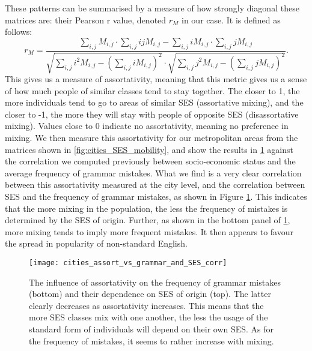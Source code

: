 \documentclass[../thesis.tex]{subfiles}
\begin{document}
These patterns can be summarised by a measure of how strongly diagonal these matrices
are: their Pearson r value, denoted $r_M$ in our case. It is defined as follows:
\begin{equation}
  r_M = \frac{
      \sum_{i, j} M_{i, j} \cdot \sum_{i, j} i j M_{i, j}
      - \sum_{i, j} i M_{i, j} \cdot \sum_{i, j} j M_{i, j}
    }{
      \sqrt{\sum_{i, j} i^2 M_{i, j} - \left( \sum_{i, j} i M_{i, j} \right)^2}
      \cdot \sqrt{\sum_{i, j} j^2 M_{i, j} - \left( \sum_{i, j} j M_{i, j} \right)^2}
    }.
\end{equation}
This gives us a measure of assortativity, meaning that this metric gives us a sense of
how much people of similar classes tend to stay together. The closer to 1, the more
individuals tend to go to areas of similar \ac{SES} (assortative mixing), and the closer
to -1, the more they will stay with people of opposite \ac{SES} (disassortative mixing).
Values close to 0 indicate no assortativity, meaning no preference in mixing. We then
measure this assortativity for our metropolitan areas from the matrices shown in
\cref{fig:cities_SES_mobility}, and show the results in
\cref{fig:cities_assort_vs_grammar_and_SES_corr} against the correlation we computed
previously between socio-economic status and the average frequency of grammar mistakes.
What we find is a very clear correlation between this assortativity measured at the city
level, and the correlation between \ac{SES} and the frequency of grammar mistakes, as
shown in Figure \cref{fig:cities_assort_vs_grammar_and_SES_corr}. This indicates that
the more mixing in the population, the less the frequency of mistakes is determined by
the \ac{SES} of origin. Further, as shown in the bottom panel of
\cref{fig:cities_assort_vs_grammar_and_SES_corr}, more mixing tends to imply more
frequent mistakes. It then appears to favour the spread in popularity of non-standard
English.
\begin{figure}
\centering
  \texttt{[image: cities\_assort\_vs\_grammar\_and\_SES\_corr]}
  \caption{The influence of assortativity on the frequency of grammar mistakes (bottom)
  and their dependence on \ac{SES} of origin (top). The latter clearly decreases as
  assortativity increases. This means that the more \ac{SES} classes mix with one
  another, the less the usage of the standard form of individuals will depend on their
  own \ac{SES}. As for the frequency of mistakes, it seems to rather increase with
  mixing.}
  \label{fig:cities_assort_vs_grammar_and_SES_corr}
\end{figure}
\end{document}
